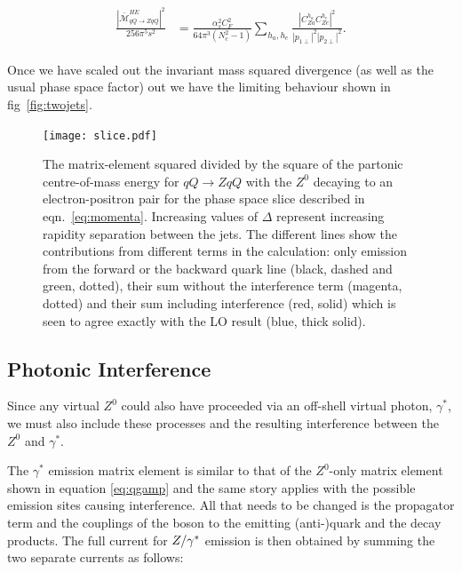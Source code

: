 		\begin{align}
		\begin{split}
			\frac{{|\bar{\mathcal{M}}_{qQ\to ZqQ}^{HE}|}^2}{256\pi^5s^2} &= \frac{\alpha_s^2C_F^2}{64\pi^3(N_c^2-1)}
			\sum_{h_a, h_e}\frac{|C_{Za}^{h_a}C_{Ze}^{h_e}|^2}{|p_{1\perp}|^2|p_{2\perp}|^2}.
			\label{eqn:zLimit}
		\end{split}
		\end{align}

		Once we have scaled out the invariant mass squared divergence (as well as the usual phase
		space factor) out we have the limiting behaviour shown in fig~\eqref{fig:twojets}.

		\begin{figure}[hbt]
		  \begin{center}
		    \texttt{[image: slice.pdf]}
		    \caption{The matrix-element squared divided by the square of the partonic
		      centre-of-mass energy for $qQ\to ZqQ$ with the $Z^0$ decaying to an
		      electron-positron pair for the phase space slice described in
		      eqn.~\eqref{eq:momenta}.  Increasing values of $\Delta$ represent
		      increasing rapidity separation between the jets.  The different lines show the contributions from
		      different terms in the calculation: only emission from the forward or the
		      backward quark line (black, dashed and green, dotted), their sum without
		      the interference term (magenta, dotted) and their sum including
		      interference (red, solid) which is seen to agree exactly with the LO result
		      (blue, thick solid).}
		    \label{fig:twojets}
		  \end{center}
		\end{figure}

	\subsection{Photonic Interference}

		Since any virtual $Z^0$ could also have proceeded via an off-shell virtual photon,
		$\gamma^*$, we must also include these processes and the resulting interference
		between the $Z^0$ and $\gamma^*$.

		The $\gamma^*$ emission matrix element is similar to that of the $Z^0$-only matrix
		element shown in equation \eqref{eq:qgamp} and the same story applies with the
		possible emission sites causing interference.  All that needs to be changed is the
		propagator term and the couplings of the boson to the emitting (anti-)quark and
		the decay products.  The full current for $Z/\gamma^*$ emission is then obtained by summing
		the two separate currents as follows:

